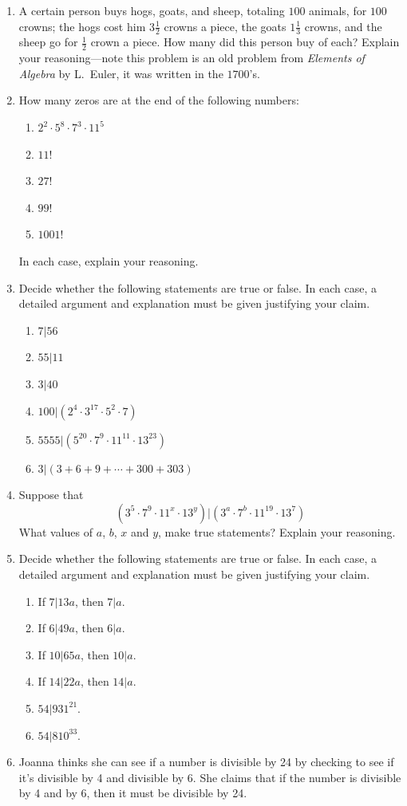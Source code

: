 \begin{problems}
\begin{enumerate}
\item A certain person buys hogs, goats, and sheep, totaling $100$
  animals, for $100$ crowns; the hogs cost him $3\frac{1}{2}$ crowns
  a piece, the goats $1\frac{1}{3}$ crowns, and the sheep go for
  $\frac{1}{2}$ crown a piece. How many did this person buy of each?
  Explain your reasoning---note this problem is an old problem from
  \textit{Elements of Algebra} by L.\ Euler, it was written in the
  $1700$'s.
\item How many zeros are at the end of the following numbers:
\begin{enumerate}
\item $2^2 \cdot 5^8 \cdot 7^3\cdot 11^5$
\item $11!$
\item $27!$
\item $99!$
\item $1001!$
\end{enumerate}
In each case, explain your reasoning.
\item Decide whether the following statements are true or false. In
  each case, a detailed argument and explanation must be given
  justifying your claim.
\begin{enumerate}
\item $7|56$
\item $55|11$
\item $3|40$
\item $100 | (2^4\cdot 3^{17} \cdot 5^2\cdot 7)$
\item $5555 | (5^{20}\cdot 7^9\cdot 11^{11}\cdot 13^{23})$ 
\item $3| (3+ 6 + 9 + \cdots +300 + 303)$
\end{enumerate}
\item Suppose that 
\[
(3^5 \cdot 7^9 \cdot 11^x \cdot 13^y) | (3^a \cdot 7^b \cdot 11^{19} \cdot 13^7)
\]
What values of $a$, $b$, $x$ and $y$, make true statements? Explain
your reasoning.
\item Decide whether the following statements are true or false. In
  each case, a detailed argument and explanation must be given
  justifying your claim.
\begin{enumerate}
\item If $7|13a$, then $7|a$.
\item If $6|49a$, then $6|a$. 
\item If $10|65a$, then $10|a$.
\item If $14|22a$, then $14|a$.
\item $54|931^{21}$.
\item $54|810^{33}$.
\end{enumerate}
\item Joanna thinks she can see if a number is divisible by 24 by
  checking to see if it's divisible by 4 and divisible by 6.  She
  claims that if the number is divisible by 4 and by 6, then it must
  be divisible by 24.


\end{enumerate}
\end{problems}
